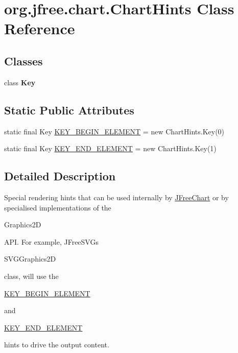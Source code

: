 \hypertarget{classorg_1_1jfree_1_1chart_1_1_chart_hints}{}\section{org.\+jfree.\+chart.\+Chart\+Hints Class Reference}
\label{classorg_1_1jfree_1_1chart_1_1_chart_hints}
\subsection*{Classes}
\begin{DoxyCompactItemize}
\item 
class {\bfseries Key}
\end{DoxyCompactItemize}
\subsection*{Static Public Attributes}
\begin{DoxyCompactItemize}
\item 
static final Key \mbox{\hyperlink{classorg_1_1jfree_1_1chart_1_1_chart_hints_a9a277800f7e1bb7451f2501f22dfcac7}{K\+E\+Y\+\_\+\+B\+E\+G\+I\+N\+\_\+\+E\+L\+E\+M\+E\+NT}} = new Chart\+Hints.\+Key(0)
\item 
static final Key \mbox{\hyperlink{classorg_1_1jfree_1_1chart_1_1_chart_hints_aa000d8596f376cf98e1ca44d595322e4}{K\+E\+Y\+\_\+\+E\+N\+D\+\_\+\+E\+L\+E\+M\+E\+NT}} = new Chart\+Hints.\+Key(1)
\end{DoxyCompactItemize}


\subsection{Detailed Description}
Special rendering hints that can be used internally by \mbox{\hyperlink{classorg_1_1jfree_1_1chart_1_1_j_free_chart}{J\+Free\+Chart}} or by specialised implementations of the
\begin{DoxyCode}
Graphics2D 
\end{DoxyCode}
 A\+PI. For example, J\+Free\+S\+VG\textquotesingle{}s
\begin{DoxyCode}
SVGGraphics2D 
\end{DoxyCode}
 class, will use the 
\begin{DoxyCode}
\mbox{\hyperlink{classorg_1_1jfree_1_1chart_1_1_chart_hints_a9a277800f7e1bb7451f2501f22dfcac7}{KEY\_BEGIN\_ELEMENT}} 
\end{DoxyCode}
 and
\begin{DoxyCode}
\mbox{\hyperlink{classorg_1_1jfree_1_1chart_1_1_chart_hints_aa000d8596f376cf98e1ca44d595322e4}{KEY\_END\_ELEMENT}} 
\end{DoxyCode}
 hints to drive the output content.

